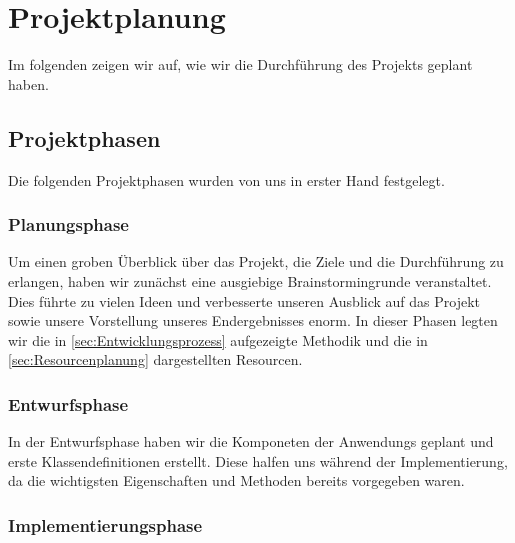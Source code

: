 \section{Projektplanung}
Im folgenden zeigen wir auf, wie wir die Durchführung des Projekts geplant haben.

\subsection{Projektphasen}
Die folgenden Projektphasen wurden von uns in erster Hand festgelegt.

\subsubsection{Planungsphase}
Um einen groben Überblick über das Projekt, die Ziele und die Durchführung zu erlangen,
haben wir zunächst eine ausgiebige Brainstormingrunde veranstaltet. Dies führte zu vielen Ideen
und verbesserte unseren Ausblick auf das Projekt sowie unsere Vorstellung unseres Endergebnisses
enorm.
In dieser Phasen legten wir die in \ref{sec:Entwicklungsprozess} aufgezeigte Methodik und die in
\ref{sec:Resourcenplanung} dargestellten Resourcen.

\subsubsection{Entwurfsphase}
In der Entwurfsphase haben wir die Komponeten der Anwendungs geplant und erste Klassendefinitionen
erstellt. Diese halfen uns während der Implementierung, da die wichtigsten Eigenschaften und Methoden
bereits vorgegeben waren.

\subsubsection{Implementierungsphase}


